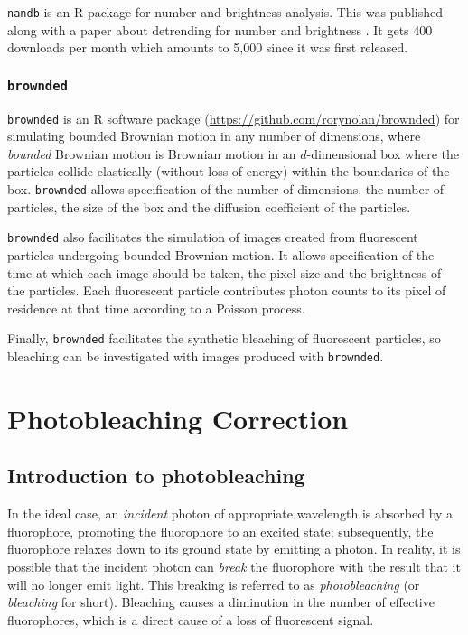 \documentclass[12pt,]{book}
\theoremstyle{definition}
\theoremstyle{definition}
\theoremstyle{definition}
\theoremstyle{remark}
\begin{document}
\texttt{nandb} is an R package for number and brightness analysis. This
was published along with a paper about detrending for number and
brightness \citep{nandb}. It gets 400 downloads per month which amounts
to 5,000 since it was first released.

\subsection{\texorpdfstring{\texttt{brownded}}{brownded}}\label{brownded}

\texttt{brownded} is an R software package
(\url{https://github.com/rorynolan/brownded}) for simulating bounded
Brownian motion in any number of dimensions, where \emph{bounded}
Brownian motion is Brownian motion in an \(d\)-dimensional box where the
particles collide elastically (without loss of energy) within the
boundaries of the box. \texttt{brownded} allows specification of the
number of dimensions, the number of particles, the size of the box and
the diffusion coefficient of the particles.

\texttt{brownded} also facilitates the simulation of images created from
fluorescent particles undergoing bounded Brownian motion. It allows
specification of the time at which each image should be taken, the pixel
size and the brightness of the particles. Each fluorescent particle
contributes photon counts to its pixel of residence at that time
according to a Poisson process.

Finally, \texttt{brownded} facilitates the synthetic bleaching of
fluorescent particles, so bleaching can be investigated with images
produced with \texttt{brownded}.

\chapter{Photobleaching Correction}\label{photobleaching-correction}

\section{Introduction to
photobleaching}\label{introduction-to-photobleaching}

In the ideal case, an \emph{incident} photon of appropriate wavelength
is absorbed by a fluorophore, promoting the fluorophore to an excited
state; subsequently, the fluorophore relaxes down to its ground state by
emitting a photon. In reality, it is possible that the incident photon
can \emph{break} the fluorophore with the result that it will no longer
emit light. This breaking is referred to as \emph{photobleaching} (or
\emph{bleaching} for short). Bleaching causes a diminution in the number
of effective fluorophores, which is a direct cause of a loss of
fluorescent signal.
\end{document}
